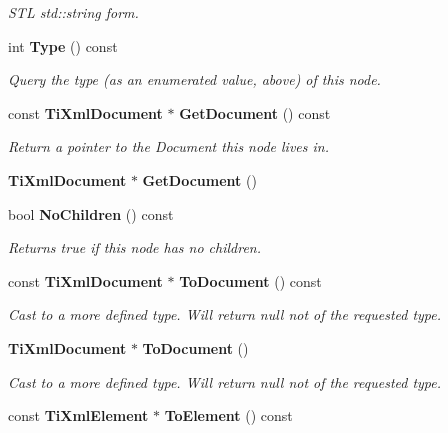 \begin{CompactItemize}
\begin{CompactList}\small\item\em STL std::string form. \item\end{CompactList}\item 
int {\bf Type} () const
\begin{CompactList}\small\item\em Query the type (as an enumerated value, above) of this node. \item\end{CompactList}\item 
const {\bf Ti\-Xml\-Document} $\ast$ {\bf Get\-Document} () const
\begin{CompactList}\small\item\em Return a pointer to the Document this node lives in. \item\end{CompactList}\item 
{\bf Ti\-Xml\-Document} $\ast$ {\bf Get\-Document} ()\label{classTiXmlNode_TiXmlUnknowna64}

\item 
bool {\bf No\-Children} () const\label{classTiXmlNode_TiXmlUnknowna65}

\begin{CompactList}\small\item\em Returns true if this node has no children. \item\end{CompactList}\item 
const {\bf Ti\-Xml\-Document} $\ast$ {\bf To\-Document} () const\label{classTiXmlNode_TiXmlUnknowna66}

\begin{CompactList}\small\item\em Cast to a more defined type. Will return null not of the requested type. \item\end{CompactList}\item 
{\bf Ti\-Xml\-Document} $\ast$ {\bf To\-Document} ()\label{classTiXmlNode_TiXmlUnknowna67}

\begin{CompactList}\small\item\em Cast to a more defined type. Will return null not of the requested type. \item\end{CompactList}\item 
const {\bf Ti\-Xml\-Element} $\ast$ {\bf To\-Element} () const\label{classTiXmlNode_TiXmlUnknowna68}


\end{CompactItemize}
